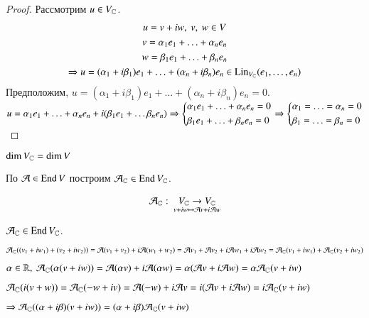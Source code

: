 \documentclass[main]{subfiles}
\begin{document}
\begin{proof}
    Рассмотрим $u \in V_{\mathbb{C}}$.
    \begin{gather*}
        u = v + iw, \ v, \ w \in V \\
        v = \alpha_1 e_1 + \ldots + \alpha_n e_n \\
        w = \beta_1 e_1 + \ldots + \beta_n e_n \\
        \Rightarrow u = (\alpha_1 + i\beta_1) e_1 + \ldots + (\alpha_n + i\beta_n) e_n \in \operatorname{Lin}_{V_{\mathbb{C}}} (e_1, \ldots, e_n)
    \end{gather*} 
    Предположим, $u = (\alpha_1 + i\beta_1) e_1 + \ldots + (\alpha_n + i\beta_n) e_n  = 0$.
    $u = \alpha_1 e_1 + \ldots + \alpha_n e_n + i(\beta_1 e_1 + \ldots \beta_n e_n) \Rightarrow
    \left\{ \begin{gathered} 
          \alpha_1 e_1 + \ldots + \alpha_n e_n = 0 \hfill 
          \\ 
          \beta_1 e_1 + \ldots + \beta_n e_n = 0 \hfill 
          \\ 
        \end{gathered}   \right.\Rightarrow
        \left\{ \begin{gathered} 
            \alpha_1 = \ldots = \alpha_n = 0 \hfill 
            \\ 
            \beta_1 = \ldots  =\beta_n = 0 \hfill 
            \\ 
          \end{gathered} \right.$
\end{proof}

\begin{corollary}
    $\dim V_{\mathbb{C}} = \dim V$
\end{corollary}

По $\mathcal{A} \in \operatorname{End} V$ построим $\mathcal{A}_{\mathbb{C}} \in \operatorname{End} V_{\mathbb{C}}$.

\begin{gather*}
    \mathcal{A}_{\mathbb{C}}: \ \underset{v+iw \mapsto \mathcal{A} v + i \mathcal{A} w}{V_{\mathbb{C}} \rightarrow V_{\mathbb{C}}}
\end{gather*}

\begin{proposition}
    $\mathcal{A}_{\mathbb{C}} \in \operatorname{End} V_{\mathbb{C}}$.

    $\mathcal{A}_{\mathbb{C}}((v_1+iw_1)+(v_2+ iw_2)) = \mathcal{A}(v_1 + v_2) + i\mathcal{A}(w_1 + w_2) =
    \mathcal{A} v_1 + \mathcal{A} v_2 + i\mathcal{A} w_1 + i\mathcal{A} w_2 = \mathcal{A}_{\mathbb{C}}(v_1 + iw_1) + \mathcal{A}_{\mathbb{C}}(v_2 + iw_2)$

    $\alpha \in \mathbb{R}, \ \mathcal{A}_{\mathbb{C}}(\alpha(v + iw)) = \mathcal{A}(\alpha v) + i\mathcal{A}(\alpha w) = 
    \alpha(\mathcal{A} v + i\mathcal{A} w) = \alpha \mathcal{A}_{\mathbb{C}}(v+ iw)$

    $\mathcal{A}_{\mathbb{C}}(i(v+w)) = \mathcal{A}_{\mathbb{C}}(-w + iv) = \mathcal{A}(-w) + i\mathcal{A} v = i(\mathcal{A} v + i\mathcal{A} w) = i \mathcal{A}_{\mathbb{C}}(v + iw)$

    $\Rightarrow \mathcal{A}_{\mathbb{C}}((\alpha + i\beta)(v+iw)) = (\alpha + i\beta)\mathcal{A}_{\mathbb{C}}(v+iw)$
\end{proposition}
\end{document}
